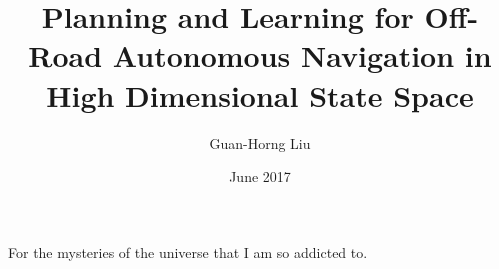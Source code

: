 \documentclass[hidelinks, 12pt]{cmuthesis}
\begin{document}
 
\frontmatter

\pagestyle{empty}

\title{ %
{\bf Planning and Learning for Off-Road Autonomous Navigation in High Dimensional State Space}}
\author{Guan-Horng Liu}
\date{June 2017}


\support{}
\disclaimer{}



\maketitle

\begin{dedication}
For the mysteries of the universe that I am so addicted to.
\end{dedication}

\pagestyle{plain}
\end{document}
